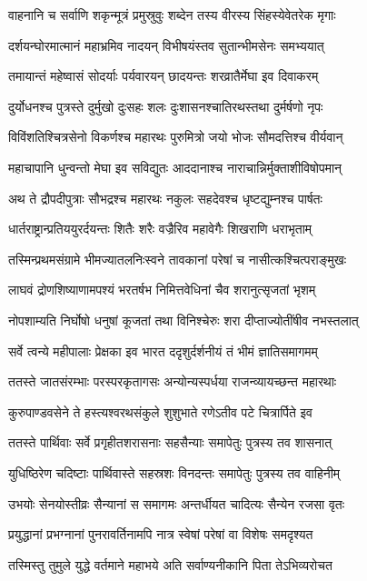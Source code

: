 \twolineshloka
{वाहनानि च सर्वाणि शकृन्मूत्रं प्रमुस्रुवुः}
{शब्देन तस्य वीरस्य सिंहस्येवेतरेक मृगाः}


\twolineshloka
{दर्शयन्घोरमात्मानं महाभ्रमिव नादयन्}
{विभीषयंस्तव सुतान्भीमसेनः समभ्ययात्}


\twolineshloka
{तमायान्तं महेष्वासं सोदर्याः पर्यवारयन्}
{छादयन्तः शरव्रातैर्मेघा इव दिवाकरम्}


\twolineshloka
{दुर्योधनश्च पुत्रस्ते दुर्मुखो दुःसहः शलः}
{दुःशासनश्चातिरथस्तथा दुर्मर्षणो नृपः}


\twolineshloka
{विविंशतिश्चित्रसेनो विकर्णश्च महारथः}
{पुरुमित्रो जयो भोजः सौमदत्तिश्च वीर्यवान्}


\twolineshloka
{महाचापानि धुन्वन्तो मेघा इव सविद्युतः}
{आददानाश्च नाराचान्निर्मुक्ताशीविषोपमान्}


\twolineshloka
{अथ ते द्रौपदीपुत्राः सौभद्रश्च महारथः}
{नकुलः सहदेवश्च धृष्टद्युम्नश्च पार्षतः}


\twolineshloka
{धार्तराष्ट्रान्प्रतिययुरर्दयन्तः शितैः शरैः}
{वज्रैरिव महावेगैः शिखराणि धराभृताम्}


\twolineshloka
{तस्मिन्प्रथमसंग्रामे भीमज्यातलनिःस्वने}
{तावकानां परेषां च नासीत्कश्चित्पराङ्मुखः}


\twolineshloka
{लाघवं द्रोणशिष्याणामपश्यं भरतर्षभ}
{निमित्तवेधिनां चैव शरानुत्सृजतां भृशम्}


\twolineshloka
{नोपशाम्यति निर्घोषो धनुषां कूजतां तथा}
{विनिश्चेरुः शरा दीप्ताज्योतींषीव नभस्तलात्}


\twolineshloka
{सर्वे त्वन्ये महीपालाः प्रेक्षका इव भारत}
{ददृशुर्दर्शनीयं तं भीमं ज्ञातिसमागमम्}


\twolineshloka
{ततस्ते जातसंरम्भाः परस्परकृतागसः}
{अन्योन्यस्पर्धया राजन्व्यायच्छन्त महारथाः}


\twolineshloka
{कुरुपाण्डवसेने ते हस्त्यश्वरथसंकुले}
{शुशुभाते रणेऽतीव पटे चित्रार्पिते इव}


\twolineshloka
{ततस्ते पार्थिवाः सर्वे प्रगृहीतशरासनाः}
{सहसैन्याः समापेतुः पुत्रस्य तव शासनात्}


\twolineshloka
{युधिष्ठिरेण चदिष्टाः पार्थिवास्ते सहस्रशः}
{विनदन्तः समापेतुः पुत्रस्य तव वाहिनीम्}


\twolineshloka
{उभयोः सेनयोस्तीव्रः सैन्यानां स समागमः}
{अन्तर्धीयत चादित्यः सैन्येन रजसा वृतः}


\twolineshloka
{प्रयुद्धानां प्रभग्नानां पुनरावर्तिनामपि}
{नात्र स्वेषां परेषां वा विशेषः समदृश्यत}


\twolineshloka
{तस्मिस्तु तुमुले युद्धे वर्तमाने महाभये}
{अति सर्वाण्यनीकानि पिता तेऽभिव्यरोचत}


